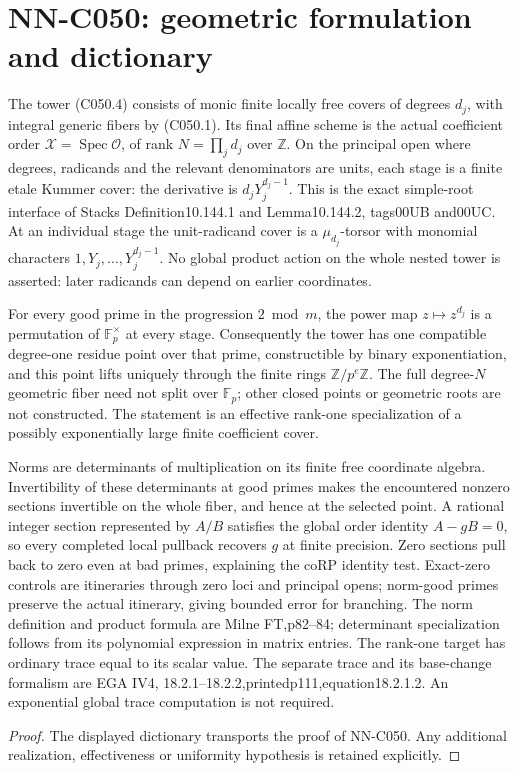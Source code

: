 \section{NN-C050: geometric formulation and dictionary}
\begin{geometricstatement}[NN-C050]
The tower (C050.4) consists of monic finite locally free covers
of degrees $d_j$, with integral generic fibers by (C050.1).
Its final affine scheme is the actual coefficient order
$\mathcal X=\operatorname{Spec}\mathcal O$, of rank
$N=\prod_jd_j$ over $\mathbb Z$. On the principal open where
degrees, radicands and the relevant denominators are units,
each stage is a finite etale Kummer cover: the derivative is
$d_jY_j^{d_j-1}$. This is the exact simple-root interface of
Stacks Definition10.144.1 and Lemma10.144.2, tags00UB and00UC.
At an individual stage the unit-radicand cover is a
$\mu_{d_j}$-torsor with monomial characters
$1,Y_j,\ldots,Y_j^{d_j-1}$. No global product action on the
whole nested tower is asserted: later radicands can depend on
earlier coordinates.

For every good prime in the progression $2\bmod m$, the power
map $z\mapsto z^{d_j}$ is a permutation of $\mathbb F_p^\times$
at every stage. Consequently the tower has one compatible
degree-one residue point over that prime, constructible by
binary exponentiation, and this point lifts uniquely through
the finite rings $\mathbb Z/p^e\mathbb Z$. The full degree-$N$
geometric fiber need not split over $\mathbb F_p$; other closed
points or geometric roots are not constructed. The statement
is an effective rank-one specialization of a possibly
exponentially large finite coefficient cover.

Norms are determinants of multiplication on its finite free
coordinate algebra. Invertibility of these determinants at
good primes makes the encountered nonzero sections invertible
on the whole fiber, and hence at the selected point. A rational
integer section represented by $A/B$ satisfies the global
order identity $A-gB=0$, so every completed local pullback
recovers $g$ at finite precision. Zero sections pull back to
zero even at bad primes, explaining the coRP identity test.
Exact-zero controls are itineraries through zero loci and
principal opens; norm-good primes preserve the actual itinerary,
giving bounded error for branching. The norm definition and
product formula are Milne FT,p82--84; determinant specialization
follows from its polynomial expression in matrix entries.
The rank-one target has ordinary trace equal to its scalar value.
The separate trace and its base-change formalism are EGA IV4,
18.2.1--18.2.2,printedp111,equation18.2.1.2. An exponential
global trace computation is not required.
\end{geometricstatement}
\begin{proof} The displayed dictionary transports the proof of NN-C050. Any additional realization, effectiveness or uniformity hypothesis is retained explicitly.\end{proof}


